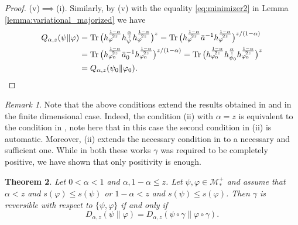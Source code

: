 \documentclass[12pt]{article}
\newtheorem{theorem}{Theorem}[section]
\theoremstyle{definition}
\theoremstyle{remark}
\newtheorem{remark}[theorem]{Remark}
\numberwithin{equation}{section}
\def\Me{\mathcal M}
\def \Tr{\mathrm{Tr}\,}
\def\ffi{\varphi}
\begin{document}
\begin{proof}
(v)$\implies$(i).\enspace
Similarly, by (v) with the equality \eqref{eq:minimizer2} in Lemma
\ref{lemma:variational_majorized} we have
\begin{align*}
Q_{\alpha,z}(\psi\|\ffi)
&=\Tr\bigl(h_\ffi^{1-\alpha\over2z}h_\psi^{\alpha\over z}h_\ffi^{1-\alpha\over2z}\bigr)^z
=\Tr\bigl(h_\ffi^{1-\alpha\over2z}\bar a^{-1}h_\ffi^{1-\alpha\over2z}\bigr)^{z/(1-\alpha)} \\
&=\Tr\bigl(h_{\ffi_0}^{1-\alpha\over2z}\bar a_0^{-1}h_{\ffi_0}^{1-\alpha\over2z}\bigr)^{z/(1-\alpha)}
=\Tr\bigl(h_{\ffi_0}^{1-\alpha\over2z}h_{\psi_0}^{\alpha\over z}h_{\ffi_0}^{1-\alpha\over2z}\bigr)^z \\
&=Q_{\alpha,z}(\psi_0\|\ffi_0).
\end{align*}
\end{proof}


\begin{remark}\label{rem:conditions} Note that the above conditions extend the results
obtained in \cite{leditzky2017data} and \cite{zhang2020equality} in
the finite dimensional case.
Indeed, the condition (ii) with $\alpha=z$ is equivalent to the condition in \cite[Thm.
1]{leditzky2017data}, note here that in this case the second condition in (ii) is
automatic. Moreover, (ii) extends the necessary condition in \cite[Thm. 1.2
(2)]{zhang2020equality} to a necessary and sufficient one. While in both these
 works $\gamma$ was required to be completely positive, we have shown that only
positivity is enough. 

\end{remark}





\begin{theorem}\label{thm:suffle1} Let $0<\alpha<1$ and $\alpha,1-\alpha\le
z$. Let $\psi,\varphi\in \Me_*^+$ and assume that $\alpha<z$ and $s(\ffi)\le
s(\psi)$ or $1-\alpha<z$ and $s(\psi)\le s(\ffi)$. 
Then $\gamma$ is reversible with respect to
$\{\psi,\varphi\}$ if and only if
\[
D_{\alpha,z}(\psi\|\varphi)=D_{\alpha,z}(\psi\circ\gamma\|\varphi\circ\gamma).
\]

\end{theorem}
\end{document}
